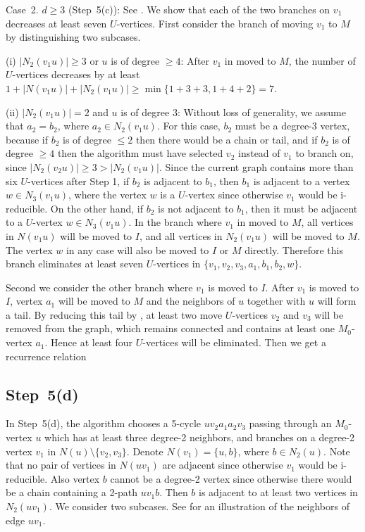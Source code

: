 \documentclass{elsart_TR2}
\begin{document}
Case~2. $d\geq 3$ (Step~5(c)): See .
We show that each of the two branches on $v_1$  decreases at least seven $U$-vertices.
First consider  the branch of moving $v_1$ to $M$ by distinguishing two subcases.

(i) $|N_2(v_1u)|\geq 3$ or $u$ is of degree $\geq 4$:
After $v_1$ in moved to $M$, the number of $U$-vertices decreases by at least
$1+|N(v_1u)|+|N_2(v_1u)|\geq \min\{1+3+3,1+4+2\}=7$.

(ii) $|N_2(v_1u)|=2$ and $u$ is of degree $3$:
Without loss of generality, we assume that $a_2=b_2$, where  $a_2\in N_2(v_1u)$.
For this case, $b_2$ must be a degree-3 vertex,
because if $b_2$ is of degree $\leq 2$ then there would be a chain or tail,
and if $b_2$ is of degree $\geq 4$ then the algorithm must have selected $v_2$ instead of $v_1$ to branch on,
since $|N_2(v_2u)|\geq 3> |N_2(v_1u)|$.
Since  the current graph contains more than six $U$-vertices after Step 1,
  if $b_2$ is adjacent to $b_1$, then $b_1$ is adjacent to  a vertex  $w\in N_3(v_1u)$,
where the vertex $w$ is a $U$-vertex since otherwise $v_1$ would be i-reducible.
On the other hand, if $b_2$ is not adjacent to $b_1$,
 then it must be adjacent to a $U$-vertex $w\in N_3(v_1u)$.
In the branch where $v_1$ in moved to $M$,   all vertices in $N(v_1u)$ will be moved to $I$,
 and all vertices in  $N_2(v_1u)$ will be moved to $M$.
The vertex $w$ in any case will also be moved to $I$ or $M$ directly.
Therefore this branch eliminates at least seven $U$-vertices in $\{v_1,v_2,v_3, a_1, b_1,b_2,w\}$.

Second we consider the other branch where $v_1$ is moved to $I$.
After $v_1$ is moved to $I$, vertex $a_1$ will be moved to $M$ and the neighbors of $u$ together with $u$ will form a tail.
By reducing this tail by , at least two move $U$-vertices $v_2$ and $v_3$ will be removed from the graph,
which remains connected and contains at least one $M_0$-vertex $a_1$.
Hence at least four $U$-vertices will be eliminated.
Then we get a recurrence relation 




\subsection{Step~5(d)}

In Step~5(d), the algorithm chooses  a 5-cycle $uv_2a_1a_2v_3$ passing through
an  $M_0$-vertex $u$ which has at least three degree-2  neighbors,
and branches on a degree-2 vertex $v_1$ in $N(u)\setminus\{v_2,v_3\}$.
Denote $N(v_1)=\{u,b\}$, where  $b\in N_2(u)$.
Note that no pair of vertices in $N(uv_1)$ are adjacent  since otherwise $v_1$ would be i-reducible.
Also vertex $b$ cannot be a degree-2 vertex since
otherwise there would be a chain containing
a 2-path $uv_1b$.
Then $b$ is adjacent to at least two vertices in $N_2(uv_1)$.
We consider two subcases.
See  for an illustration of the neighbors of edge $uv_1$.
\end{document}
